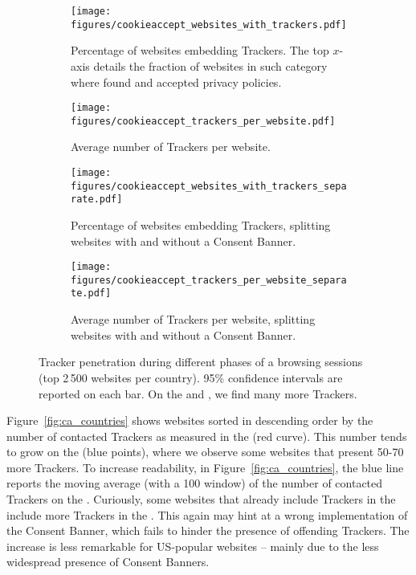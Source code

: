 \begin{figure}
    \centering
    \begin{subfigure}[t]{0.495\columnwidth}
        \texttt{[image: figures/cookieaccept\_websites\_with\_trackers.pdf]}
        \caption{Percentage of websites embedding Trackers. The top $x$-axis details the fraction of websites in such category where \TOOL found and accepted privacy policies.}
        \label{fig:ca_country_one}
    \end{subfigure}
    \begin{subfigure}[t]{0.495\columnwidth}
        \texttt{[image: figures/cookieaccept\_trackers\_per\_website.pdf]}
        \caption{Average number of Trackers per website.}
        \label{fig:ca_country_avg}
    \end{subfigure}
        \begin{subfigure}[t]{0.495\columnwidth}
        \texttt{[image: figures/cookieaccept\_websites\_with\_trackers\_separate.pdf]}
        \caption{Percentage of websites embedding Trackers, splitting websites with and without a Consent Banner.}
        \label{fig:ca_country_one_sep}
    \end{subfigure}
        \begin{subfigure}[t]{0.495\columnwidth}
        \texttt{[image: figures/cookieaccept\_trackers\_per\_website\_separate.pdf]}
        \caption{Average number of Trackers per website, splitting websites with and without a Consent Banner.}
        \label{fig:ca_country_avg_sep}
    \end{subfigure}
	\caption{Tracker penetration during different phases of a browsing sessions (top 2\,500 websites per country).  95\% confidence intervals are reported on each bar. On the \AFTER and \INTERNAL, we find many more Trackers.}
	\label{fig:ca_country}
\end{figure}

Figure~\ref{fig:ca_countries} shows websites sorted in descending order by the number of contacted Trackers as measured in the \BEFORE (red curve). This number tends to grow on the \AFTER (blue points), where we observe some websites that present 50-70 more Trackers. To increase readability, in Figure~\ref{fig:ca_countries}, the blue line reports the moving average (with a 100 window) of the number of contacted Trackers on the \AFTER. Curiously, some websites that already include Trackers in the \BEFORE include more Trackers in the \AFTER. This again may hint at a wrong implementation of the Consent Banner, which fails to hinder the presence of offending Trackers. The increase is less remarkable for US-popular websites -- mainly due to the less widespread presence of Consent Banners. 

